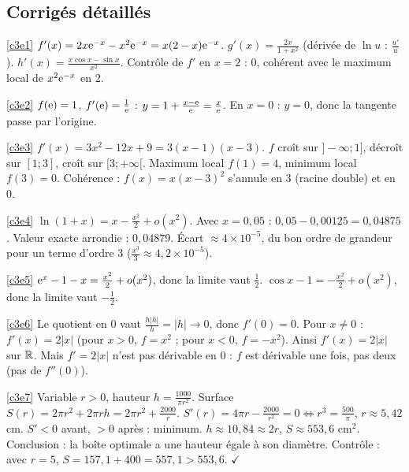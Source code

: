 \ifcorr
\subsection{Corrigés détaillés}
\begin{corrige}{\ref{c3e1}}
$f'(x)=2x\mathrm{e}^{-x}-x^2\mathrm{e}^{-x}=x(2-x)\mathrm{e}^{-x}$. $g'(x)=\frac{2x}{1+x^2}$ (dérivée de $\ln u$ : $\frac{u'}u$). $h'(x)=\frac{x\cos x-\sin x}{x^2}$. Contrôle de $f'$ en $x=2$ : $0$, cohérent avec le maximum local de $x^2\mathrm{e}^{-x}$ en $2$.
\end{corrige}
\begin{corrige}{\ref{c3e2}}
$f(\mathrm{e})=1$, $f'(\mathrm{e})=\frac1{\mathrm{e}}$ : $y=1+\frac{x-\mathrm{e}}{\mathrm{e}}=\frac x{\mathrm{e}}$. En $x=0$ : $y=0$, donc la tangente passe par l'origine.
\end{corrige}
\begin{corrige}{\ref{c3e3}}
$f'(x)=3x^2-12x+9=3(x-1)(x-3)$. $f$ croît sur $]-\infty;1]$, décroît sur $[1;3]$, croît sur $[3;+\infty[$. Maximum local $f(1)=4$, minimum local $f(3)=0$. Cohérence : $f(x)=x(x-3)^2$ s'annule en $3$ (racine double) et en $0$.
\end{corrige}
\begin{corrige}{\ref{c3e4}}
$\ln(1+x)=x-\frac{x^2}2+o(x^2)$. Avec $x=0{,}05$ : $0{,}05-0{,}00125=0{,}04875$. Valeur exacte arrondie : $0{,}04879$. Écart $\approx4\times10^{-5}$, du bon ordre de grandeur pour un terme d'ordre 3 ($\frac{x^3}3\approx4{,}2\times10^{-5}$).
\end{corrige}
\begin{corrige}{\ref{c3e5}}
$\mathrm{e}^x-1-x=\frac{x^2}2+o(x^2)$, donc la limite vaut $\frac12$. $\cos x-1=-\frac{x^2}2+o(x^2)$, donc la limite vaut $-\frac12$.
\end{corrige}
\begin{corrige}{\ref{c3e6}}
Le quotient en $0$ vaut $\frac{h|h|}h=|h|\to0$, donc $f'(0)=0$. Pour $x\ne0$ : $f'(x)=2|x|$ (pour $x>0$, $f=x^2$ ; pour $x<0$, $f=-x^2$). Ainsi $f'(x)=2|x|$ sur $\mathbb{R}$. Mais $f'=2|x|$ n'est pas dérivable en $0$ : $f$ est dérivable une fois, pas deux (pas de $f''(0)$).
\end{corrige}
\begin{corrige}{\ref{c3e7}}
Variable $r>0$, hauteur $h=\frac{1000}{\pi r^2}$. Surface $S(r)=2\pi r^2+2\pi rh=2\pi r^2+\frac{2000}r$. $S'(r)=4\pi r-\frac{2000}{r^2}=0\iff r^3=\frac{500}\pi$, $r\approx5{,}42$ cm. $S'<0$ avant, $>0$ après : minimum. $h\approx10{,}84\approx2r$, $S\approx553{,}6$ cm$^2$. Conclusion : la boîte optimale a une hauteur égale à son diamètre. Contrôle : avec $r=5$, $S=157{,}1+400=557{,}1>553{,}6$. $\checkmark$
\end{corrige}
